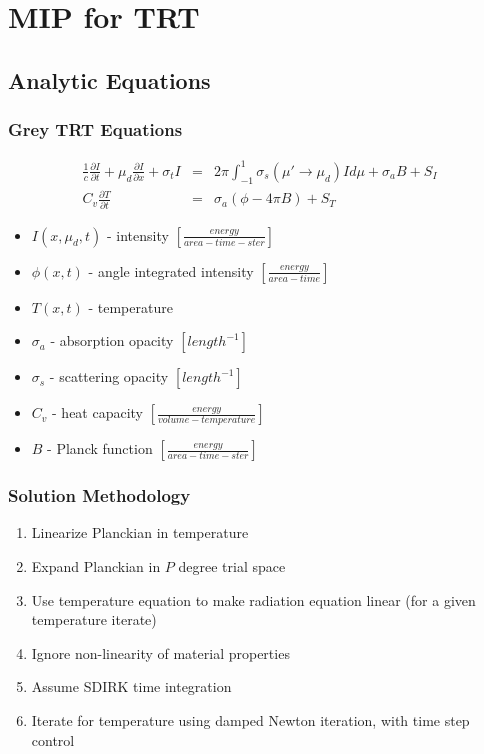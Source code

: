 \documentclass{beamer}
\newcommand{\bea}{\begin{eqnarray*}}  %
\newcommand{\eea}{\end{eqnarray*}}
\newcommand{\p}{\ensuremath{ \partial}}			%
\begin{document}
\section{MIP for TRT}
\subsection{Analytic Equations}
\begin{frame}
\frametitle{Grey TRT Equations}
\bea
\frac{1}{c} \frac{\partial I}{\p t} + \mu_d \frac{\p I}{\p x}  + \sigma_t I &=&  2\pi \int_{-1}^{1}{ \sigma_s(\mu'\to\mu_d) I  d\mu }+ \sigma_a B + S_I\\
C_v \frac{\p T}{\p t} &=&   \sigma_a \left( \phi- 4\pi B   \right) + S_T
\eea
\centering
\begin{itemize}
\item $I(x,\mu_d,t)$ - intensity $\left[ \frac{energy}{area-time-ster} \right]$
\item $\phi(x,t)$ - angle integrated intensity $\left[ \frac{energy}{area-time} \right]$
\item $T(x,t)$ - temperature
\item $\sigma_{a}$ - absorption opacity  $\left[ {length}^{-1} \right]$
\item $\sigma_{s}$ - scattering opacity  $\left[ {length}^{-1} \right]$
\item $C_v$ - heat capacity $\left[ \frac{energy}{volume-temperature} \right]$
\item $B$ - Planck function $\left[ \frac{energy}{area-time-ster} \right]$
\end{itemize}
\end{frame}

\begin{frame}
\frametitle{Solution Methodology}
\begin{enumerate}
\item Linearize Planckian in temperature
\item Expand Planckian in $P$ degree trial space
\item Use temperature equation to make radiation equation linear (for a given temperature iterate)
\item Ignore non-linearity of material properties
\item Assume SDIRK time integration
\item Iterate for temperature using damped Newton iteration, with time step control
\end{enumerate}
\end{frame}
\end{document}
